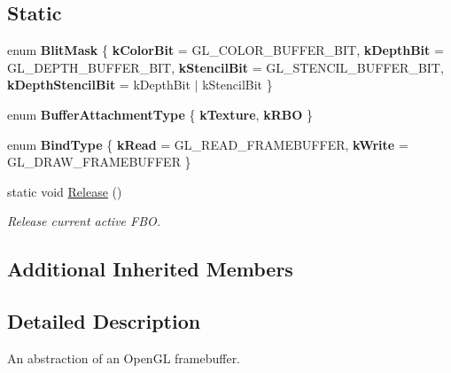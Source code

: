 \subsection*{Static}
\begin{DoxyCompactItemize}
\item 
\mbox{\label{classrev_1_1_frame_buffer_aac3791e7ddbdff594eb71b708c6f557f}} 
enum {\bfseries Blit\+Mask} \{ {\bfseries k\+Color\+Bit} = G\+L\+\_\+\+C\+O\+L\+O\+R\+\_\+\+B\+U\+F\+F\+E\+R\+\_\+\+B\+IT, 
{\bfseries k\+Depth\+Bit} = G\+L\+\_\+\+D\+E\+P\+T\+H\+\_\+\+B\+U\+F\+F\+E\+R\+\_\+\+B\+IT, 
{\bfseries k\+Stencil\+Bit} = G\+L\+\_\+\+S\+T\+E\+N\+C\+I\+L\+\_\+\+B\+U\+F\+F\+E\+R\+\_\+\+B\+IT, 
{\bfseries k\+Depth\+Stencil\+Bit} = k\+Depth\+Bit $\vert$ k\+Stencil\+Bit
 \}
\item 
\mbox{\label{classrev_1_1_frame_buffer_accd1b171fd05c92f04fc38b41c337b0a}} 
enum {\bfseries Buffer\+Attachment\+Type} \{ {\bfseries k\+Texture}, 
{\bfseries k\+R\+BO}
 \}
\item 
\mbox{\label{classrev_1_1_frame_buffer_af5069fcf7ffc5a3f10008a40982fbdf0}} 
enum {\bfseries Bind\+Type} \{ {\bfseries k\+Read} = G\+L\+\_\+\+R\+E\+A\+D\+\_\+\+F\+R\+A\+M\+E\+B\+U\+F\+F\+ER, 
{\bfseries k\+Write} = G\+L\+\_\+\+D\+R\+A\+W\+\_\+\+F\+R\+A\+M\+E\+B\+U\+F\+F\+ER
 \}
\item 
\mbox{\label{classrev_1_1_frame_buffer_a7552663a1870ffa2bfa02be91a25ca31}} 
static void \mbox{\hyperlink{classrev_1_1_frame_buffer_a7552663a1870ffa2bfa02be91a25ca31}{Release}} ()
\begin{DoxyCompactList}\small\item\em Release current active F\+BO. \end{DoxyCompactList}\end{DoxyCompactItemize}
\subsection*{Additional Inherited Members}


\subsection{Detailed Description}
An abstraction of an Open\+GL framebuffer. 

